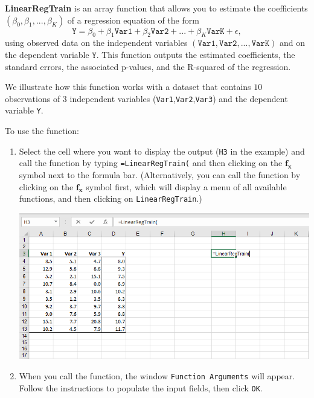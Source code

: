 \documentclass[12pt]{article}
\begin{document}
\textbf{LinearRegTrain} is an array function that allows you to estimate the coefficients $(\beta_0,\beta_1,...,\beta_K)$ of a regression equation of the form
\[
\texttt{Y}=\beta_0+\beta_1 \texttt{Var1}+\beta_2 \texttt{Var2} +...+ \beta_K \texttt{VarK}+\epsilon,
\]
using observed data on the independent variables $(\texttt{Var1},\texttt{Var2},...,\texttt{VarK})$ and on the dependent variable $\texttt{Y}$. This function outputs the estimated coefficients, the standard errors, the associated p-values, and the R-squared of the regression.

We illustrate how this function works with a dataset that contains $10$ observations of $3$ independent variables (\texttt{Var1},\texttt{Var2},\texttt{Var3}) and the dependent variable \texttt{Y}.

To use the function:
\begin{enumerate}
\item Select the cell where you want to display the output (\texttt{H3} in the example) and call the function by typing \texttt{=LinearRegTrain(} and then clicking on the $\boldsymbol{f_x}$ symbol next to the formula bar. (Alternatively, you can call the function by clicking on the  $\boldsymbol{f_x}$ symbol first, which will display a menu of all available functions, and then clicking on \texttt{LinearRegTrain}.)

\medskip

\centerline{\includegraphics[width=6in]{figures/LinRegTrain1}}

\medskip

\item When you call the function, the window \texttt{Function Arguments} will appear. Follow the instructions to populate the input fields, then click \texttt{OK}.

\medskip


\end{enumerate}
\end{document}
